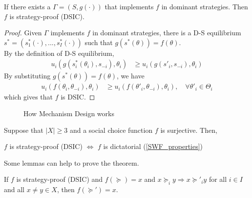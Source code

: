 \documentclass[11pt]{elegantbook}
\begin{document}
\begin{theorem}
    If there exists a $\Gamma=(S,g(\cdot))$ that implements $f$ in dominant strategies. Then $f$ is strategy-proof (DSIC).
\end{theorem}
\begin{proof}
    Given $\Gamma$ implements $f$ in dominant strategies, there is a  D-S equilibrium $s^*=\left(s_1^*(\cdot),...,s_I^*(\cdot)\right)$ such that $g(s^*(\theta))=f(\theta)$.\\
    By the definition of D-S equilibrium,
    \begin{equation}
        \begin{aligned}
            u_i(g(s_i^*(\theta_i),s_{-i}),\theta_i)&\geq u_i(g(s'_i,s_{-i}),\theta_i)
        \end{aligned}
        \nonumber
    \end{equation}
    By substituting $g(s^*(\theta))=f(\theta)$, we have
    \begin{equation}
        \begin{aligned}
            u_i(f(\theta_i,\theta_{-i}),\theta_i)&\geq u_i(f(\theta'_i,\theta_{-i}),\theta_i),\quad \forall \theta'_i\in\Theta_i
        \end{aligned}
        \nonumber
    \end{equation}
    which gives that $f$ is DSIC.
\end{proof}

\begin{center}\begin{figure}[htbp]
    \centering
    \caption{How Mechanism Design works}
    \label{}
\end{figure}\end{center}

\begin{theorem}
    Suppose that $|X|\geq 3$ and a social choice function $f$ is surjective. Then,
    \begin{center}
        $f$ is strategy-proof (DSIC) $\Leftrightarrow$ $f$ is dictatorial (\ref{SWF_properties})
    \end{center}
\end{theorem}
Some lemmas can help to prove the theorem.
\begin{lemma}
    If $f$ is strategy-proof (DSIC) and $f(\succeq)=x$ and $x\succeq_i y \Rightarrow x\succeq'_i y$ for all $i\in I$ and all $x\neq y\in X$, then $f(\succeq')=x$.
\end{lemma}
\end{document}
